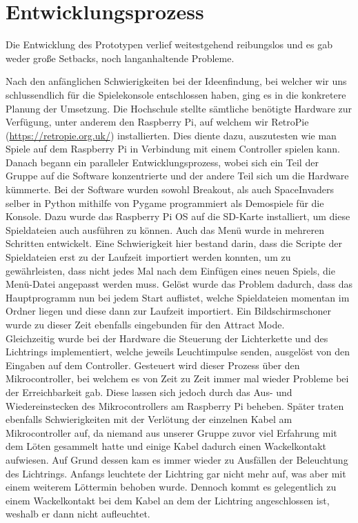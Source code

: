 \section{Entwicklungsprozess}
Die Entwicklung des Prototypen verlief weitestgehend reibungslos und es gab weder große Setbacks, noch langanhaltende Probleme. 

Nach den anfänglichen Schwierigkeiten bei der Ideenfindung, bei welcher wir uns schlussendlich für die Spielekonsole entschlossen haben, ging es in die konkretere Planung der Umsetzung. Die Hochschule stellte sämtliche benötigte Hardware zur Verfügung, unter anderem den Raspberry Pi, auf welchem wir RetroPie (\url{https://retropie.org.uk/}) installierten. Dies diente dazu, auszutesten wie man Spiele auf dem Raspberry Pi in Verbindung mit einem Controller spielen kann. \\

Danach begann ein paralleler Entwicklungsprozess, wobei sich ein Teil der Gruppe auf die Software konzentrierte und der andere Teil sich um die Hardware kümmerte. Bei der Software wurden sowohl Breakout, als auch SpaceInvaders selber in Python mithilfe von Pygame programmiert als Demospiele für die Konsole. Dazu wurde das Raspberry Pi OS auf die SD-Karte installiert, um diese Spieldateien auch ausführen zu können. Auch das Menü wurde in mehreren Schritten entwickelt. Eine Schwierigkeit hier bestand darin, dass die Scripte der Spieldateien erst zu der Laufzeit importiert werden konnten, um zu gewährleisten, dass nicht jedes Mal nach dem Einfügen eines neuen Spiels, die Menü-Datei angepasst werden muss. Gelöst wurde das Problem dadurch, dass das Hauptprogramm nun bei jedem Start auflistet, welche Spieldateien momentan im Ordner liegen und diese dann zur Laufzeit importiert. Ein Bildschirmschoner wurde zu dieser Zeit ebenfalls eingebunden für den Attract Mode.\\
Gleichzeitig wurde bei der Hardware die Steuerung der Lichterkette und des Lichtrings implementiert, welche jeweils Leuchtimpulse senden, ausgelöst von den Eingaben auf dem Controller. Gesteuert wird dieser Prozess über den Mikrocontroller, bei welchem es von Zeit zu Zeit immer mal wieder Probleme bei der Erreichbarkeit gab. Diese lassen sich jedoch durch das Aus- und Wiedereinstecken des Mikrocontrollers am Raspberry Pi beheben. Später traten ebenfalls Schwierigkeiten mit der Verlötung der einzelnen Kabel am Mikrocontroller auf, da niemand aus unserer Gruppe zuvor viel Erfahrung mit dem Löten gesammelt hatte und einige Kabel dadurch einen Wackelkontakt aufwiesen. Auf Grund dessen kam es immer wieder zu Ausfällen der Beleuchtung des Lichtrings. Anfangs leuchtete der Lichtring gar nicht mehr auf, was aber mit einem weiterem Löttermin behoben wurde. Dennoch kommt es gelegentlich zu einem Wackelkontakt bei dem Kabel an dem der Lichtring angeschlossen ist, weshalb er dann nicht aufleuchtet.\\

